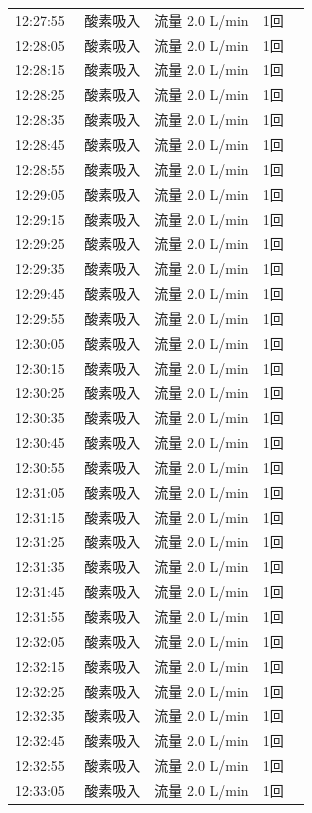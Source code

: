 \documentclass[UTF8,10pt,a4paper,fontset=fandol]{ctexart}
\begin{document}
\begin{minipage}[t]{0.48\linewidth}
\begin{tabular}{@{}p{0.22\linewidth}p{0.72\linewidth}@{}}
12:27:55 & 酸素吸入　流量 2.0 L/min　1回\\
12:28:05 & 酸素吸入　流量 2.0 L/min　1回\\
12:28:15 & 酸素吸入　流量 2.0 L/min　1回\\
12:28:25 & 酸素吸入　流量 2.0 L/min　1回\\
12:28:35 & 酸素吸入　流量 2.0 L/min　1回\\
12:28:45 & 酸素吸入　流量 2.0 L/min　1回\\
12:28:55 & 酸素吸入　流量 2.0 L/min　1回\\
12:29:05 & 酸素吸入　流量 2.0 L/min　1回\\
12:29:15 & 酸素吸入　流量 2.0 L/min　1回\\
12:29:25 & 酸素吸入　流量 2.0 L/min　1回\\
12:29:35 & 酸素吸入　流量 2.0 L/min　1回\\
12:29:45 & 酸素吸入　流量 2.0 L/min　1回\\
12:29:55 & 酸素吸入　流量 2.0 L/min　1回\\
12:30:05 & 酸素吸入　流量 2.0 L/min　1回\\
12:30:15 & 酸素吸入　流量 2.0 L/min　1回\\
12:30:25 & 酸素吸入　流量 2.0 L/min　1回\\
12:30:35 & 酸素吸入　流量 2.0 L/min　1回\\
12:30:45 & 酸素吸入　流量 2.0 L/min　1回\\
12:30:55 & 酸素吸入　流量 2.0 L/min　1回\\
12:31:05 & 酸素吸入　流量 2.0 L/min　1回\\
12:31:15 & 酸素吸入　流量 2.0 L/min　1回\\
12:31:25 & 酸素吸入　流量 2.0 L/min　1回\\
12:31:35 & 酸素吸入　流量 2.0 L/min　1回\\
12:31:45 & 酸素吸入　流量 2.0 L/min　1回\\
12:31:55 & 酸素吸入　流量 2.0 L/min　1回\\
12:32:05 & 酸素吸入　流量 2.0 L/min　1回\\
12:32:15 & 酸素吸入　流量 2.0 L/min　1回\\
12:32:25 & 酸素吸入　流量 2.0 L/min　1回\\
12:32:35 & 酸素吸入　流量 2.0 L/min　1回\\
12:32:45 & 酸素吸入　流量 2.0 L/min　1回\\
12:32:55 & 酸素吸入　流量 2.0 L/min　1回\\
12:33:05 & 酸素吸入　流量 2.0 L/min　1回\\

\end{tabular}
\end{minipage}
\end{document}
